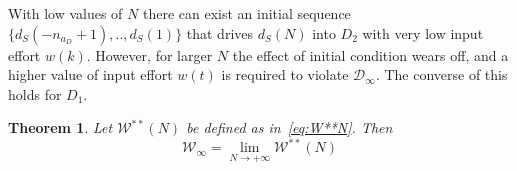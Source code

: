 \documentclass[letterpaper, 10 pt, conference]{ieeeconf}  %
\newtheorem{theorem}{Theorem}
\newcommand{\AB}[1]{\textbf{\color{magenta}{[AB: #1]}}}
\begin{document}
\vspace{2pt}
With low values of $N$ there can exist an initial sequence $\{d_S(-n_{a_D}+1),..,d_S(1)\}$ that drives $d_S(N)$ into $D_2$ with very low input effort $w(k)$. However, for larger $N$ the effect of initial condition wears off, and a higher value of input effort $w(t)$ is required to violate $\mathcal{D}_{\infty}$. The converse of this holds for $D_1$.

\begin{theorem}
Let $\mathcal{W}^{**}(N)$ be defined as in~\eqref{eq:W**N}. Then
\[
    \mathcal{W}_{\infty} = \lim_{N\rightarrow+\infty}\mathcal{W}^{**}(N)
\]
\end{theorem} 
\end{document}
